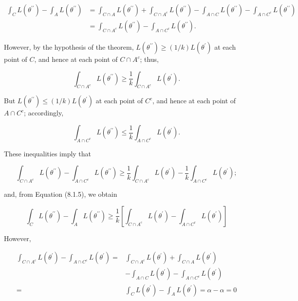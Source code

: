 \begin{align*}
\int_{C} L\left(\theta^{\prime \prime}\right)-\int_{A} L\left(\theta^{\prime \prime}\right) & =\int_{C \cap A} L\left(\theta^{\prime \prime}\right)+\int_{C \cap A^{c}} L\left(\theta^{\prime \prime}\right)-\int_{A \cap C} L\left(\theta^{\prime \prime}\right)-\int_{A \cap C^{c}} L\left(\theta^{\prime \prime}\right) \\
& =\int_{C \cap A^{c}} L\left(\theta^{\prime \prime}\right)-\int_{A \cap C^{c}} L\left(\theta^{\prime \prime}\right) . \tag{8.1.5}
\end{align*}


However, by the hypothesis of the theorem, $L\left(\theta^{\prime \prime}\right) \geq(1 / k) L\left(\theta^{\prime}\right)$ at each point of $C$, and hence at each point of $C \cap A^{c}$; thus,

$$
\int_{C \cap A^{c}} L\left(\theta^{\prime \prime}\right) \geq \frac{1}{k} \int_{C \cap A^{c}} L\left(\theta^{\prime}\right) .
$$

But $L\left(\theta^{\prime \prime}\right) \leq(1 / k) L\left(\theta^{\prime}\right)$ at each point of $C^{c}$, and hence at each point of $A \cap C^{c}$; accordingly,

$$
\int_{A \cap C^{c}} L\left(\theta^{\prime \prime}\right) \leq \frac{1}{k} \int_{A \cap C^{c}} L\left(\theta^{\prime}\right) .
$$

These inequalities imply that

$$
\int_{C \cap A^{c}} L\left(\theta^{\prime \prime}\right)-\int_{A \cap C^{c}} L\left(\theta^{\prime \prime}\right) \geq \frac{1}{k} \int_{C \cap A^{c}} L\left(\theta^{\prime}\right)-\frac{1}{k} \int_{A \cap C^{c}} L\left(\theta^{\prime}\right) ;
$$

and, from Equation (8.1.5), we obtain


\begin{equation*}
\int_{C} L\left(\theta^{\prime \prime}\right)-\int_{A} L\left(\theta^{\prime \prime}\right) \geq \frac{1}{k}\left[\int_{C \cap A^{c}} L\left(\theta^{\prime}\right)-\int_{A \cap C^{c}} L\left(\theta^{\prime}\right)\right] \tag{8.1.6}
\end{equation*}


However,

$$
\begin{aligned}
\int_{C \cap A^{c}} L\left(\theta^{\prime}\right)-\int_{A \cap C^{c}} L\left(\theta^{\prime}\right)= & \int_{C \cap A^{c}} L\left(\theta^{\prime}\right)+\int_{C \cap A} L\left(\theta^{\prime}\right) \\
& -\int_{A \cap C} L\left(\theta^{\prime}\right)-\int_{A \cap C^{c}} L\left(\theta^{\prime}\right) \\
= & \int_{C} L\left(\theta^{\prime}\right)-\int_{A} L\left(\theta^{\prime}\right)=\alpha-\alpha=0
\end{aligned}
$$

